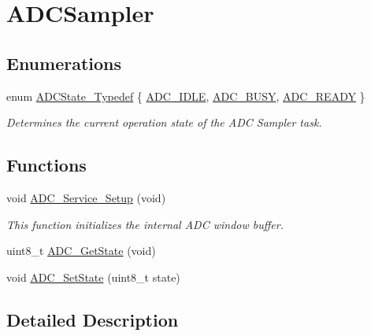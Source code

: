 \hypertarget{group___a_d_c_sampler}{}\section{A\+D\+C\+Sampler}
\label{group___a_d_c_sampler}
\subsection*{Enumerations}
\begin{DoxyCompactItemize}
\item 
enum \hyperlink{group___a_d_c_sampler_ga4665f630da2d72cbf75619d63592daf9}{A\+D\+C\+State\+\_\+\+Typedef} \{ \hyperlink{group___a_d_c_sampler_gga4665f630da2d72cbf75619d63592daf9aa37cde1dabf7658cc9bb359dc7ad7ce8}{A\+D\+C\+\_\+\+I\+D\+LE}, 
\hyperlink{group___a_d_c_sampler_gga4665f630da2d72cbf75619d63592daf9a2842f316ee95b7800e3f9bb55d9c3bc1}{A\+D\+C\+\_\+\+B\+U\+SY}, 
\hyperlink{group___a_d_c_sampler_gga4665f630da2d72cbf75619d63592daf9a7f2a1a2c5aece4f36847bf5cea31cd14}{A\+D\+C\+\_\+\+R\+E\+A\+DY}
 \}\begin{DoxyCompactList}\small\item\em Determines the current operation state of the A\+DC Sampler task. \end{DoxyCompactList}
\end{DoxyCompactItemize}
\subsection*{Functions}
\begin{DoxyCompactItemize}
\item 
void \hyperlink{group___a_d_c_sampler_gacdda0c0aba15f6b2d6275cc2afdc5a05}{A\+D\+C\+\_\+\+Service\+\_\+\+Setup} (void)
\begin{DoxyCompactList}\small\item\em This function initializes the internal A\+DC window buffer. \end{DoxyCompactList}\item 
uint8\+\_\+t \hyperlink{group___a_d_c_sampler_gaa2709405ead8733f44a8710753c55ca7}{A\+D\+C\+\_\+\+Get\+State} (void)
\item 
void \hyperlink{group___a_d_c_sampler_gac45a9f22b5b35c772350fd69097da95f}{A\+D\+C\+\_\+\+Set\+State} (uint8\+\_\+t state)
\end{DoxyCompactItemize}


\subsection{Detailed Description}


